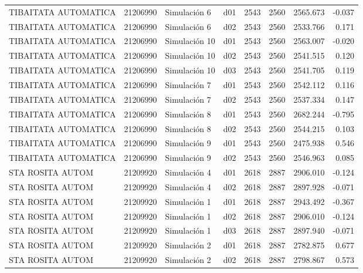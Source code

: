 \begin{landscape}
\begin{longtable}{lrlp{2cm}p{2cm}p{3cm}p{2cm}r}
    TIBAITATA AUTOMATICA &  21206990 &   Simulación 6 &   d01 &      2543 &     2560 &  2565.673 &    -0.037 \\
    TIBAITATA AUTOMATICA &  21206990 &   Simulación 6 &   d02 &      2543 &     2560 &  2533.766 &     0.171 \\
    TIBAITATA AUTOMATICA &  21206990 &  Simulación 10 &   d01 &      2543 &     2560 &  2563.007 &    -0.020 \\
    TIBAITATA AUTOMATICA &  21206990 &  Simulación 10 &   d02 &      2543 &     2560 &  2541.515 &     0.120 \\
    TIBAITATA AUTOMATICA &  21206990 &  Simulación 10 &   d03 &      2543 &     2560 &  2541.705 &     0.119 \\
    TIBAITATA AUTOMATICA &  21206990 &   Simulación 7 &   d01 &      2543 &     2560 &  2542.112 &     0.116 \\
    TIBAITATA AUTOMATICA &  21206990 &   Simulación 7 &   d02 &      2543 &     2560 &  2537.334 &     0.147 \\
    TIBAITATA AUTOMATICA &  21206990 &   Simulación 8 &   d01 &      2543 &     2560 &  2682.244 &    -0.795 \\
    TIBAITATA AUTOMATICA &  21206990 &   Simulación 8 &   d02 &      2543 &     2560 &  2544.215 &     0.103 \\
    TIBAITATA AUTOMATICA &  21206990 &   Simulación 9 &   d01 &      2543 &     2560 &  2475.938 &     0.546 \\
    TIBAITATA AUTOMATICA &  21206990 &   Simulación 9 &   d02 &      2543 &     2560 &  2546.963 &     0.085 \\
        STA ROSITA AUTOM &  21209920 &   Simulación 4 &   d01 &      2618 &     2887 &  2906.010 &    -0.124 \\
        STA ROSITA AUTOM &  21209920 &   Simulación 4 &   d02 &      2618 &     2887 &  2897.928 &    -0.071 \\
        STA ROSITA AUTOM &  21209920 &   Simulación 1 &   d01 &      2618 &     2887 &  2943.492 &    -0.367 \\
        STA ROSITA AUTOM &  21209920 &   Simulación 1 &   d02 &      2618 &     2887 &  2906.010 &    -0.124 \\
        STA ROSITA AUTOM &  21209920 &   Simulación 1 &   d03 &      2618 &     2887 &  2897.940 &    -0.071 \\
        STA ROSITA AUTOM &  21209920 &   Simulación 2 &   d01 &      2618 &     2887 &  2782.875 &     0.677 \\
        STA ROSITA AUTOM &  21209920 &   Simulación 2 &   d02 &      2618 &     2887 &  2798.867 &     0.573 \\

\end{longtable}
\end{landscape}
